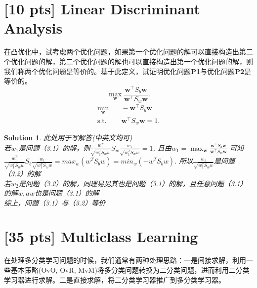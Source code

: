 \documentclass[a4paper,UTF8]{article}
\numberwithin{equation}{section}
\newtheorem*{solution}{Solution}
\begin{document}
\section{[10 pts] Linear Discriminant Analysis}
在凸优化中，试考虑两个优化问题，如果第一个优化问题的解可以直接构造出第二个优化问题的解，第二个优化问题的解也可以直接构造出第一个优化问题的解，则我们称两个优化问题是等价的。基于此定义，试证明优化问题\textbf{P1}与优化问题\textbf{P2}是等价的。
\begin{equation}
	\label{P1}
	\max_{\mathbf{w}} \frac{\mathbf{w}^\top S_b \mathbf{w}}{\mathbf{w}^\top S_w \mathbf{w}} . 
\end{equation}
\begin{equation}
	\label{P2}
	\begin{aligned}
		\min_{\mathbf{w}} & \quad -\mathbf{w}^\top S_b \mathbf{w} \\ 
		\text{s.t.} & \quad \mathbf{w}^\top S_w \mathbf{w} = 1 . 
	\end{aligned}
\end{equation}

\begin{solution} 此处用于写解答(中英文均可)\\
	若$w_1$是问题（3.1）的解，则$\frac{w_1^T}{\sqrt{w_1^T S_w w}} S_w \frac{w_1}{\sqrt{w_1^T S_w w}}=1$, 且由$w_1=\max_{\mathbf{w}} \frac{\mathbf{w}^\top S_b \mathbf{w}}{\mathbf{w}^\top S_w \mathbf{w}}$
	可知$\frac{w_1^T}{\sqrt{w_1^T S_w w}} S_b \frac{w_1}{\sqrt{w_1^T S_w w}} = max_w(w^TS_bw)=min_w(-w^TS_bw)$. 所以$\frac{w_1}{\sqrt{w_1^T S_w w}}$是问题（3.2）的解\\
	若$w_2$是问题（3.2）的解，同理易见其也是问题（3.1）的解，且任意问题（3.1）的解$w,aw$也是问题（3.1）的解
	\\ 综上，问题（3.1）与（3.2）等价
\end{solution}
\section{[35 pts] Multiclass Learning}
在处理多分类学习问题的时候，我们通常有两种处理思路：一是间接求解，利用一些基本策略(OvO, OvR, MvM)将多分类问题转换为二分类问题，进而利用二分类学习器进行求解。二是直接求解，将二分类学习器推广到多分类学习器。
\end{document}
